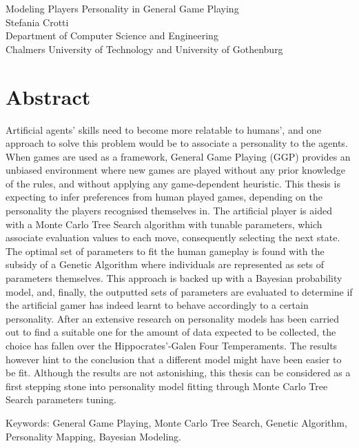 Modeling Players Personality in General Game Playing\\
Stefania Crotti\\
Department of Computer Science and Engineering\\
Chalmers University of Technology and University of Gothenburg\setlength{\parskip}{0.5cm}

\thispagestyle{plain}			%
\setlength{\parskip}{0pt plus 1.0pt}
\section*{Abstract}
Artificial agents’ skills need to become more relatable to humans’, and one approach to solve this problem would be to associate a personality to the agents. When games are used as a framework, General Game Playing (GGP) provides an unbiased environment where new games are played without any prior knowledge of the rules, and without applying any game-dependent heuristic. This thesis is expecting to infer preferences from human played games, depending on the personality the players recognised themselves in. The artificial player is aided with a Monte Carlo Tree Search algorithm with tunable parameters, which associate evaluation values to each move, consequently selecting the next state. The optimal set of parameters to fit the human gameplay is found with the subsidy of a Genetic Algorithm where individuals are represented as sets of parameters themselves. This approach is backed up with a Bayesian probability model, and, finally, the outputted sets of parameters are evaluated to determine if the artificial gamer has indeed learnt to behave accordingly to a certain personality. After an extensive research on personality models has been carried out to find a suitable one for the amount of data expected to be collected, the choice has fallen over the Hippocrates’-Galen Four Temperaments. The results however hint to the conclusion that a different model might have been easier to be fit. Although the results are not astonishing, this thesis can be considered as a first stepping stone into personality model fitting through Monte Carlo Tree Search parameters tuning.

\vfill
Keywords: General Game Playing, Monte Carlo Tree Search, Genetic Algorithm, Personality Mapping, Bayesian Modeling.

\newpage				%
\thispagestyle{empty}
\mbox{}